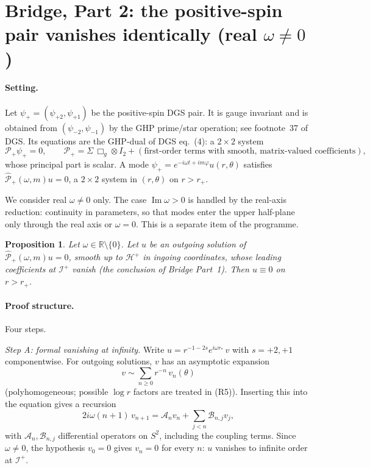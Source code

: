 \documentclass[11pt]{article}
\newtheorem{proposition}{Proposition}\newtheorem{lemma}{Lemma}
\theoremstyle{remark}\newtheorem{remark}{Remark}
\begin{document}
\section*{Bridge, Part 2: the positive-spin pair vanishes identically (real $\omega\neq0$)}

\paragraph{Setting.} Let $\psi_+=(\psi_{+2},\psi_{+1})$ be the positive-spin DGS pair. It is gauge invariant and is obtained from $(\psi_{-2},\psi_{-1})$ by the GHP prime/star operation; see footnote~37 of DGS. Its equations are the GHP-dual of DGS eq.~(4): a $2\times2$ system
\[
\mathcal P_+\psi_+=0,\qquad \mathcal P_+=\Sigma\,\Box_g\otimes I_2+(\text{first-order terms with smooth, matrix-valued coefficients}),
\]
whose principal part is scalar. A mode $\psi_+=e^{-i\omega t+im\varphi}u(r,\theta)$ satisfies $\widehat{\mathcal P}_+(\omega,m)u=0$, a $2\times2$ system in $(r,\theta)$ on $r>r_+$.

We consider real $\omega\neq0$ only. The case $\operatorname{Im}\omega>0$ is handled by the real-axis reduction: continuity in parameters, so that modes enter the upper half-plane only through the real axis or $\omega=0$. This is a separate item of the programme.

\begin{proposition}\label{prop:vanish}
Let $\omega\in\mathbb R\setminus\{0\}$. Let $u$ be an outgoing solution of $\widehat{\mathcal P}_+(\omega,m)u=0$, smooth up to $\mathcal H^+$ in ingoing coordinates, whose leading coefficients at $\mathcal I^+$ vanish (the conclusion of Bridge Part~1). Then $u\equiv0$ on $r>r_+$.
\end{proposition}

\paragraph{Proof structure.} Four steps.

\emph{Step A: formal vanishing at infinity.}
Write $u=r^{-1-2s}e^{i\omega r_*}\,v$ with $s=+2,+1$ componentwise. For outgoing solutions, $v$ has an asymptotic expansion
\[
v\sim\sum_{n\ge0}r^{-n}\,v_n(\theta)
\]
(polyhomogeneous; possible $\log r$ factors are treated in (R5)). Inserting this into the equation gives a recursion
\[
2i\omega(n+1)\,v_{n+1}=\mathcal A_n v_n+\sum_{j<n}\mathcal B_{n,j}v_j ,
\]
with $\mathcal A_n,\mathcal B_{n,j}$ differential operators on $S^2$, including the coupling terms. Since $\omega\neq0$, the hypothesis $v_0=0$ gives $v_n=0$ for every $n$: $u$ vanishes to infinite order at $\mathcal I^+$.
\end{document}
